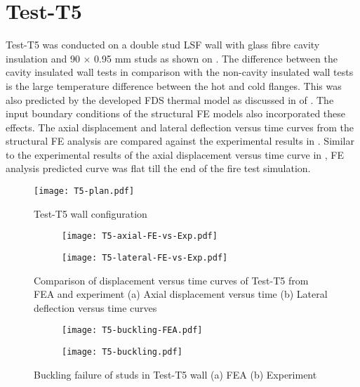 \section*{Test-T5}

Test-T5 was conducted on a double stud LSF wall with glass fibre cavity insulation and 90 $\times$ 0.95 mm studs as shown on . The difference between the cavity insulated wall tests in comparison with the non-cavity insulated wall tests is the large temperature difference between the hot and cold flanges. This was also predicted by the developed FDS thermal model as discussed in  of . The input boundary conditions of the structural FE models also incorporated these effects. The axial displacement and lateral deflection versus time curves from the structural FE analysis are compared against the experimental results in . Similar to the experimental results of the axial displacement versus time curve in , FE analysis predicted curve was flat till the end of the fire test simulation. 
\begin{figure}[!htbp]
	\centering
			\texttt{[image: T5-plan.pdf]}\\
		\caption{Test-T5 wall configuration}
		\label{fig:T5-plan-FEA}
\end{figure}
\begin{figure}[!htbp]
	\centering
	\begin{subfigure}[b]{0.7\textwidth}
		\centering
		\texttt{[image: T5-axial-FE-vs-Exp.pdf]}
		\caption{}
		\label{subfig:T5-axial-FE-vs-Exp}
	\end{subfigure}
	\begin{subfigure}[b]{0.7\textwidth}
		\centering
		\texttt{[image: T5-lateral-FE-vs-Exp.pdf]}
		\caption{}
		\label{subfig:T5-lateral-FE-vs-Exp}
	\end{subfigure}
	   \caption{Comparison of displacement versus time curves of Test-T5 from FEA and experiment (a) Axial displacement versus time (b) Lateral deflection versus time curves}
	   \label{fig:T5-structural-FE-vs-Exp}
\end{figure} 
\begin{figure}[!htbp]
	\centering
	\begin{subfigure}[b]{0.8\textwidth}
		\centering
		\texttt{[image: T5-buckling-FEA.pdf]}
		\caption{}
		\label{subfig:T5-buckling-FEA}
	\end{subfigure}
	\begin{subfigure}[b]{0.45\textwidth}
		\centering
		\texttt{[image: T5-buckling.pdf]}
		\caption{}
		\label{subfig:T5-buckling-FEA-Exp}
	\end{subfigure}
	   \caption{Buckling failure of studs in Test-T5 wall (a) FEA (b) Experiment}
	   \label{fig:T5-buckling-FE-vs-Exp}
\end{figure} 

